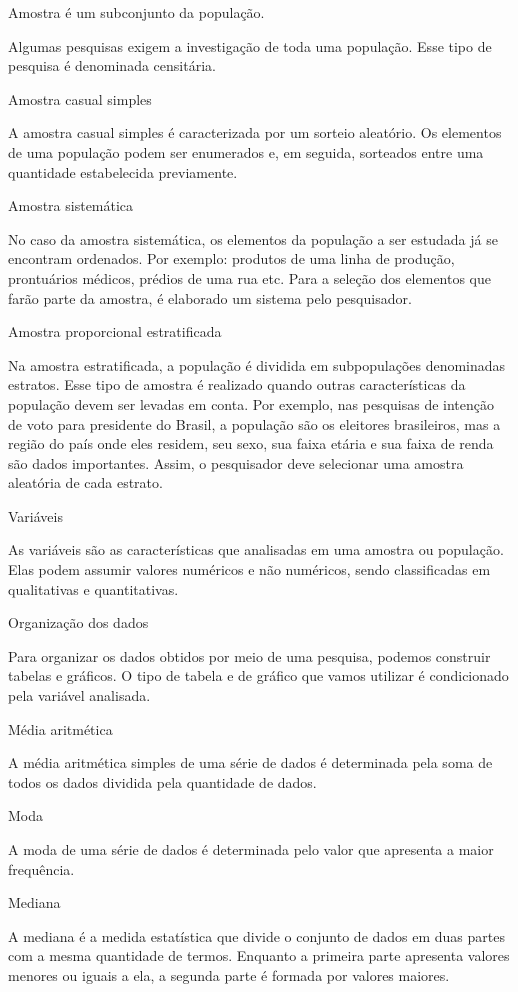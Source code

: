 {Amostra é um subconjunto da população.

Algumas pesquisas exigem a investigação de toda uma população. Esse tipo
de pesquisa é denominada censitária.

Amostra casual simples

A amostra casual simples é caracterizada por um sorteio aleatório. Os
elementos de uma população podem ser enumerados e, em seguida, sorteados
entre uma quantidade estabelecida previamente.

Amostra sistemática

No caso da amostra sistemática, os elementos da população a ser estudada
já se encontram ordenados. Por exemplo: produtos de uma linha de
produção, prontuários médicos, prédios de uma rua etc. Para a seleção
dos elementos que farão parte da amostra, é elaborado um sistema pelo
pesquisador.

Amostra proporcional estratificada

Na amostra estratificada, a população é dividida em subpopulações
denominadas estratos. Esse tipo de amostra é realizado quando outras
características da população devem ser levadas em conta. Por exemplo,
nas pesquisas de intenção de voto para presidente do Brasil, a população
são os eleitores brasileiros, mas a região do país onde eles residem,
seu sexo, sua faixa etária e sua faixa de renda são dados importantes.
Assim, o pesquisador deve selecionar uma amostra aleatória de cada
estrato.

Variáveis

As variáveis são as características que analisadas em uma amostra ou
população. Elas podem assumir valores numéricos e não numéricos, sendo
classificadas em qualitativas e quantitativas.

Organização dos dados

Para organizar os dados obtidos por meio de uma pesquisa, podemos
construir tabelas e gráficos. O tipo de tabela e de gráfico que vamos
utilizar é condicionado pela variável analisada.

Média aritmética

A média aritmética simples de uma série de dados é determinada pela soma
de todos os dados dividida pela quantidade de dados.

Moda

A moda de uma série de dados é determinada pelo valor que apresenta a
maior frequência.

Mediana

A mediana é a medida estatística que divide o conjunto de dados em duas
partes com a mesma quantidade de termos. Enquanto a primeira parte
apresenta valores menores ou iguais a ela, a segunda parte é formada por
valores maiores.

}
